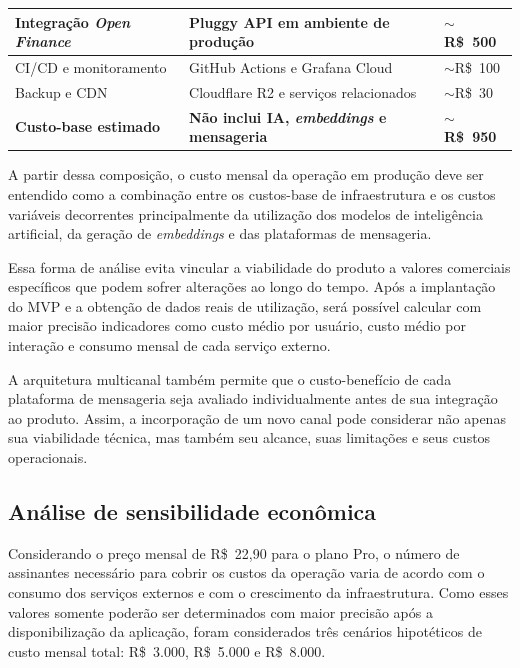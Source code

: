 {\begin{longtable}{|p{3.5cm}|p{7.0cm}|p{3.0cm}|}
Integração \textit{Open Finance} &
Pluggy API em ambiente de produção &
$\sim$R\$~500 \\ \hline

CI/CD e monitoramento &
GitHub Actions e Grafana Cloud &
$\sim$R\$~100 \\ \hline

Backup e CDN &
Cloudflare R2 e serviços relacionados &
$\sim$R\$~30 \\ \hline

\textbf{Custo-base estimado} &
\textbf{Não inclui IA, \textit{embeddings} e mensageria} &
\textbf{$\sim$R\$~950} \\ \hline

\end{longtable}
}

A partir dessa composição, o custo mensal da operação em produção deve ser entendido como a combinação entre os custos-base de infraestrutura e os custos variáveis decorrentes principalmente da utilização dos modelos de inteligência artificial, da geração de \textit{embeddings} e das plataformas de mensageria.

Essa forma de análise evita vincular a viabilidade do produto a valores comerciais específicos que podem sofrer alterações ao longo do tempo. Após a implantação do MVP e a obtenção de dados reais de utilização, será possível calcular com maior precisão indicadores como custo médio por usuário, custo médio por interação e consumo mensal de cada serviço externo.

A arquitetura multicanal também permite que o custo-benefício de cada plataforma de mensageria seja avaliado individualmente antes de sua integração ao produto. Assim, a incorporação de um novo canal pode considerar não apenas sua viabilidade técnica, mas também seu alcance, suas limitações e seus custos operacionais.


\subsection{Análise de sensibilidade econômica}

Considerando o preço mensal de R\$~22,90 para o plano Pro, o número de assinantes necessário para cobrir os custos da operação varia de acordo com o consumo dos serviços externos e com o crescimento da infraestrutura. Como esses valores somente poderão ser determinados com maior precisão após a disponibilização da aplicação, foram considerados três cenários hipotéticos de custo mensal total: R\$~3.000, R\$~5.000 e R\$~8.000.

